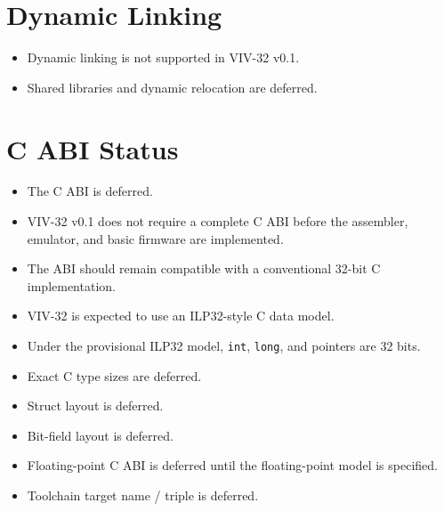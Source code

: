 \section{Dynamic Linking}

\begin{itemize}
  \item Dynamic linking is not supported in VIV-32 v0.1.
  \item Shared libraries and dynamic relocation are deferred.
\end{itemize}

\section{C ABI Status}

\begin{itemize}
  \item The C ABI is deferred.
  \item VIV-32 v0.1 does not require a complete C ABI before the assembler, emulator, and basic firmware are implemented.
  \item The ABI should remain compatible with a conventional 32-bit C implementation.
  \item VIV-32 is expected to use an ILP32-style C data model.
  \item Under the provisional ILP32 model, \texttt{int}, \texttt{long}, and pointers are 32 bits.
  \item Exact C type sizes are deferred.
  \item Struct layout is deferred.
  \item Bit-field layout is deferred.
  \item Floating-point C ABI is deferred until the floating-point model is specified.
  \item Toolchain target name / triple is deferred.
\end{itemize}
